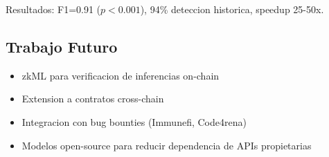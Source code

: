\documentclass[11pt]{article}
\theoremstyle{definition}
\theoremstyle{plain}
\theoremstyle{remark}
\begin{document}
Resultados: F1=0.91 ($p<0.001$), 94\% deteccion historica, speedup 25-50x.

\subsection{Trabajo Futuro}

\begin{itemize}
    \item zkML para verificacion de inferencias on-chain
    \item Extension a contratos cross-chain
    \item Integracion con bug bounties (Immunefi, Code4rena)
    \item Modelos open-source para reducir dependencia de APIs propietarias
\end{itemize}
\end{document}
